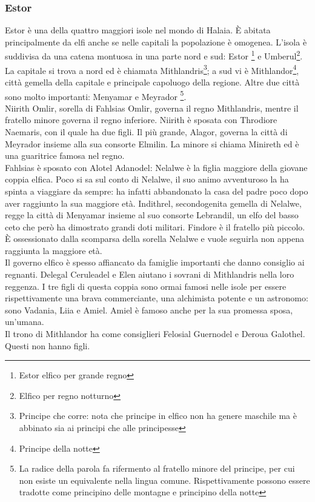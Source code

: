 \documentclass[10pt,twoside,twocolumn]{article}
\begin{document}
\subsubsection{Estor}
Estor \`e una della quattro maggiori isole nel mondo di Halaia. \`E abitata
principalmente da elfi anche se nelle capitali la popolazione \`e omogenea.
L'isola \`e suddivisa da una catena montuosa in una parte nord e sud: Estor
\footnote{Estor elfico per grande regno}
e Umberul\footnote{Elfico per regno notturno}. La capitale si trova a nord
ed \`e chiamata Mithlandris\footnote{Principe che corre: nota che principe in elfico
non ha genere maschile ma \`e abbinato sia ai principi che alle principesse}; a sud
vi \`e Mithlandor\footnote{Principe della notte}, citt\`a gemella
della capitale e principale capoluogo della regione.
Altre due citt\`a sono molto importanti: Menyamar e Meyrador
\footnote{La radice della parola fa rifermento al fratello minore del
  principe, per cui non esiste un equivalente nella lingua comune.
  Rispettivamente possono essere tradotte come principino delle montagne
  e principino della notte}.\\
Niirith Omlir, sorella di Fahlsias Omlir, governa il regno Mithlandris, mentre
il fratello minore governa il regno inferiore.
Niirith \`e sposata con Throdiore Naemaris, con il quale ha due figli. Il pi\`u
grande, Alagor, governa la citt\`a di Meyrador insieme alla sua consorte Elmilin.
La minore si chiama Minireth ed \`e una guaritrice famosa nel regno.\\
Fahlsias \`e sposato con Alotel Adanodel: Nelalwe \`e la figlia maggiore della
giovane coppia elfica. Poco si sa sul conto di Nelalwe, il suo animo avventuroso la
ha spinta a viaggiare da sempre: ha infatti abbandonato la casa del padre poco
dopo aver raggiunto la sua maggiore et\`a.
Indithrel, secondogenita gemella di Nelalwe, regge la citt\`a di Menyamar insieme
al suo consorte Lebrandil, un elfo del basso ceto che per\`o ha dimostrato grandi
doti militari.
Findore \`e il fratello pi\`u piccolo. \`E ossessionato dalla scomparsa della sorella
Nelalwe e vuole seguirla non appena raggiunta la maggiore et\`a.\\
Il governo elfico \`e spesso affiancato da famiglie importanti che danno consiglio
ai regnanti. Delegal Ceruleadel e Elen aiutano i sovrani di Mithlandris nella loro
reggenza. I tre figli di questa coppia sono ormai famosi nelle isole per essere
rispettivamente una brava commerciante, una alchimista potente e un astronomo:
sono Vadania, Liia e Amiel. Amiel \`e famoso anche per la sua promessa sposa, un'umana.\\
Il trono di Mithlandor ha come consiglieri Felosial Guernodel e Deroua Galothel.
Questi non hanno figli.
\end{document}
